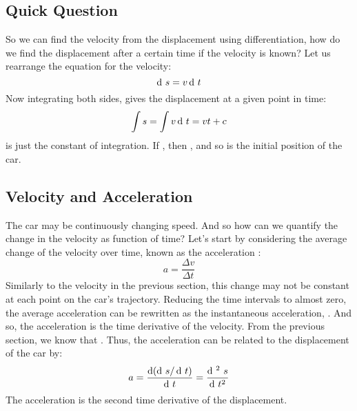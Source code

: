 \subsection*{Quick Question}
So we can find the velocity from the displacement using differentiation, how do we find the displacement after a certain time if the velocity is known? Let us rearrange the equation for the velocity:
 \begin{equation}
\operatorname{d}\!\ s = v \operatorname{d}\!\ t \label{inst_s}
\end{equation}
Now integrating both sides, gives the displacement at a given point in time:
  \begin{equation}
\int s = \int v \operatorname{d}\!\ t = vt + c
\end{equation}
 is just the constant of integration. If , then , and so  is the initial position of the car.

\subsection{Velocity and Acceleration}
The car may be continuously changing speed. And so how can we quantify the change in the velocity as function of time? Let's start by considering the average change of the velocity over time, known as the acceleration :
\begin{equation}
a = \frac{\Delta v}{\Delta t} 
\end{equation}
Similarly to the velocity in the previous section, this change may not be constant at each point on the car's trajectory. Reducing the time intervals to almost zero, the average acceleration can be rewritten as the instantaneous acceleration, . And so, the acceleration is the time derivative of the velocity. From the previous section, we know that . Thus, the acceleration can be related to the displacement of the car by:
\begin{equation}
a = \frac{\d \left(\d\ s/ \d\ t\right)}{\d\ t} = \frac{\d^{\ 2}\ s}{\d\ t^2} 
\end{equation}
 The acceleration is the second time derivative of the displacement. 
